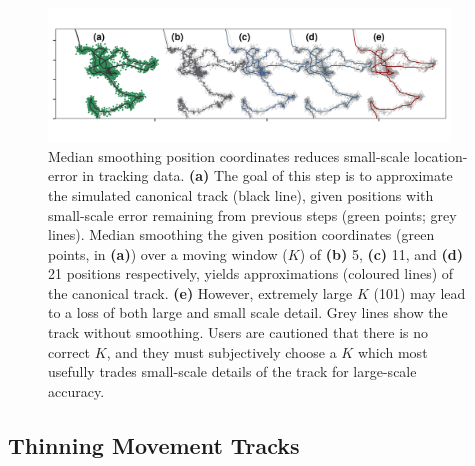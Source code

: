 \documentclass[10pt,paper=a4,headings=standardclasses
]{scrartcl}
\begin{document}
\begin{figure}[h!]
    \centering
    \includegraphics[width=0.95\textwidth]{figures/fig_03_median_smooth.png}
    \caption{Median smoothing position coordinates reduces small-scale location-error in tracking data. 
    \textbf{(a)} The goal of this step is to approximate the simulated canonical track (black line), given positions with small-scale error remaining from previous steps (green points; grey lines).
    Median smoothing the given position coordinates (green points, in \textbf{(a)}) over a moving window ($K$) of \textbf{(b)} 5, \textbf{(c)} 11, and \textbf{(d)} 21 positions respectively, yields approximations (coloured lines) of the canonical track.
    \textbf{(e)} However, extremely large $K$ (101) may lead to a loss of both large and small scale detail.
    Grey lines show the track without smoothing.
    Users are cautioned that there is no correct $K$, and they must subjectively choose a $K$ which most usefully trades small-scale details of the track for large-scale accuracy.
    }
    \label{fig:figure_median_smooth}
\end{figure}

\subsection{Thinning Movement Tracks}
\end{document}
